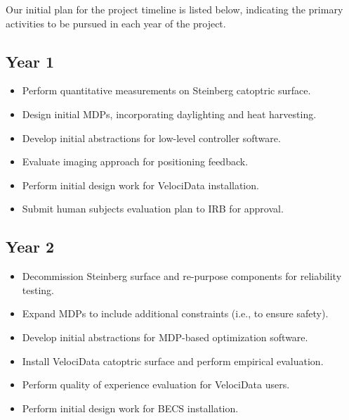 Our initial plan for the project timeline is listed below, indicating the
primary activities to be pursued in each year of the project.

\subsection*{Year 1}

\begin{itemize}

\item Perform quantitative measurements on Steinberg catoptric surface.

\item Design initial MDPs, incorporating daylighting and heat harvesting.

\item Develop initial abstractions for low-level controller software.

\item Evaluate imaging approach for positioning feedback.

\item Perform initial design work for VelociData installation.

\item Submit human subjects evaluation plan to IRB for approval.

\end{itemize}

\subsection*{Year 2}

\begin{itemize}

\item Decommission Steinberg surface and re-purpose components for
reliability testing.

\item Expand MDPs to include additional constraints (i.e., to ensure
safety).

\item Develop initial abstractions for MDP-based optimization software.

\item Install VelociData catoptric surface and perform empirical evaluation.

\item Perform quality of experience evaluation for VelociData users.

\item Perform initial design work for BECS installation.

\end{itemize}

